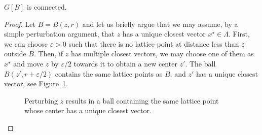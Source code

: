 \begin{lemma}
  $G[B]$ is connected.
\end{lemma}
\begin{proof}
  Let $B = B(z,r)$ and let us briefly argue that we may assume,
  by a simple perturbation argument,
  that $z$ has a unique closest vector $x^\star \in \Lambda$.
  First, we can choose $\varepsilon > 0$ such that there is no lattice point at distance
  less than $\varepsilon$ outside $B$.
  Then, if $z$ has multiple closest vectors, we may choose one of them as $x^\star$
  and move $z$ by $\varepsilon/2$ towards it to obtain a new center $z'$.
  The ball $B(z', r + \varepsilon/2)$ contains the same lattice points as $B$,
  and $z'$ has a unique closest vector, see Figure~\ref{fig:perturbation-center-of-ball-keeps-lattice-points}.

  \begin{figure}
    \begin{center}
    \end{center}
    \caption{Perturbing $z$ results in a ball containing the same lattice point whose center has a unique closest vector.}
    \label{fig:perturbation-center-of-ball-keeps-lattice-points}
  \end{figure}


\end{proof}
